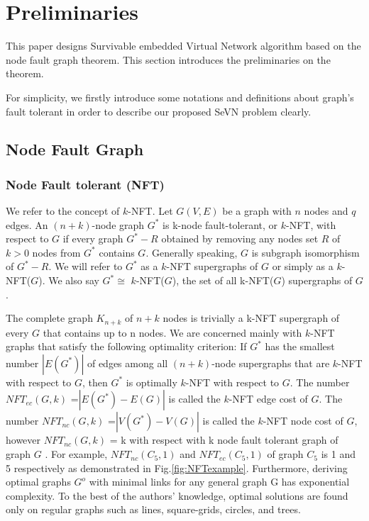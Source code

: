 
\section{Preliminaries}
\label{sec:Preliminaries}
This paper designs Survivable embedded Virtual Network algorithm based on the node fault graph theorem. This section introduces the
preliminaries on the theorem.

For simplicity, we firstly introduce some notations and definitions about graph's fault tolerant in order to describe our proposed SeVN problem clearly.

\subsection{Node Fault Graph}
\subsubsection{Node Fault tolerant (NFT)}
We refer to the concept of $k$-NFT\cite{harary1996node}. Let $G(V,E)$ be a graph with $n$ nodes and $q$ edges. An $(n+k)$-node graph $G^*$ is k-node fault-tolerant, or $k$-NFT, with respect to $G$ if every graph $G^*-R$ obtained by removing any nodes set $R$ of $k>0$ nodes from $G^*$ contains $G$. Generally speaking, $G$ is subgraph isomorphism of $G^*-R$. We will refer to $G^*$ as a $k$-NFT supergraphs of $G$ or simply as a $k$-NFT($G$). We also say $G^*\cong$ $k$-NFT($G$), the set of all k-NFT($G$) supergraphs of $G$.

The complete graph $K_{n+k}$ of $n + k$ nodes is trivially a k-NFT supergraph of every $G$ that contains up to n nodes. We are concerned mainly with $k$-NFT graphs that satisfy the following optimality criterion: If $G^*$ has the smallest number $|E(G^*)|$ of edges among all $(n + k)$-node supergraphs that are $k$-NFT with respect to $G$, then $G^*$ is optimally $k$-NFT with respect to $G$. The number $NFT_{ec}$$(G,k)$ =$|E(G^*)-E(G)|$ is called the $k$-NFT edge cost of $G$. The number $NFT_{nc}$$(G,k)$ =$|V(G^*)-V(G)|$ is called the $k$-NFT node cost of $G$, however $NFT_{nc}$$(G,k)$ = k with respect with k node fault tolerant graph of graph $G$ . For example, $NFT_{nc}$$(C_5,1)$ and $NFT_{ec}$$(C_5,1)$ of graph $C_5$ is 1 and 5 respectively as demonstrated in Fig.\ref{fig:NFTexample}. Furthermore, deriving optimal graphs $G^o$ with minimal links for any general graph G has exponential complexity. To the best of the authors’ knowledge, optimal solutions are found only on regular graphs such as lines, square-grids, circles, and trees.

